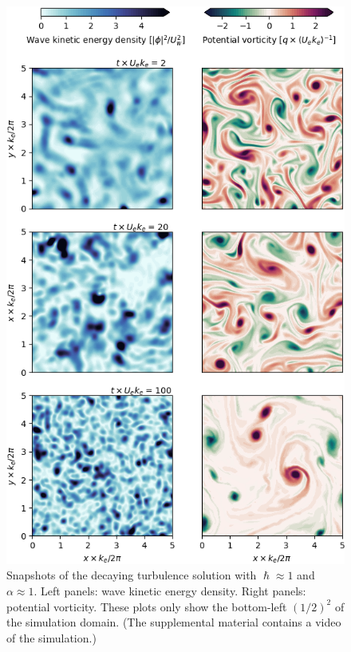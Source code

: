 \documentclass{jfm}
\begin{document}
 \begin{figure}
 \label{snaps_turb}
 \centering
 \includegraphics[width=.84\textwidth]{figs/fig3.png}
 \caption{Snapshots of the decaying turbulence solution with $\hslash \approx 1$
         and $\alpha \approx 1$. Left panels: wave kinetic energy density.
         Right panels: potential vorticity. These plots only show the bottom-left
        $(1/2)^2$ of the simulation domain. (The supplemental material contains a video
         of the simulation.)}
 \end{figure}
\end{document}
